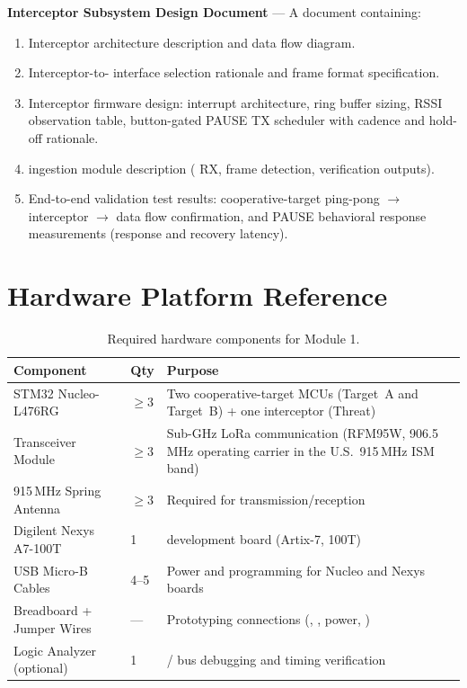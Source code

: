 \documentclass[11pt,letterpaper]{article}
\begin{document}
	\begin{tcolorbox}[deliverable={Session 4 Deliverable}]
		\textbf{Interceptor Subsystem Design Document} --- A document containing:
		\begin{enumerate}
			\item Interceptor architecture description and data flow diagram.
			\item Interceptor-to-\FPGA{} interface selection rationale and frame format specification.
			\item Interceptor firmware design: interrupt architecture, ring buffer sizing, RSSI observation table, button-gated PAUSE TX scheduler with cadence and hold-off rationale.
			\item \FPGA{} ingestion module description (\UART{} RX, frame detection, verification outputs).
			\item End-to-end validation test results: cooperative-target ping-pong $\to$ interceptor $\to$ \FPGA{} data flow confirmation, and PAUSE behavioral response measurements (response and recovery latency).
		\end{enumerate}
	\end{tcolorbox}

	\newpage
	\section{Hardware Platform Reference}
	\label{sec:hardware}

	\begin{table}[ht!]
		\centering
		\caption{Required hardware components for Module 1.}
		\label{tab:hardware}
		\renewcommand{\arraystretch}{1.3}
		\begin{tabularx}{\textwidth}{l l X}
			\toprule
			\textbf{Component} & \textbf{Qty} & \textbf{Purpose} \\
			\midrule
			STM32 Nucleo-L476RG & $\geq 3$ & Two cooperative-target MCUs (Target~A and Target~B) + one interceptor (Threat) \MCU{} \\
			\RF{} Transceiver Module & $\geq 3$ & Sub-GHz LoRa communication (RFM95W, 906.5\,MHz operating carrier in the U.S.\ 915\,MHz ISM band) \\
			915\,MHz Spring Antenna & $\geq 3$ & Required for \RF{} transmission/reception \\
			Digilent Nexys A7-100T & 1 & \FPGA{} development board (Artix-7, 100T) \\
			USB Micro-B Cables & 4--5 & Power and programming for Nucleo and Nexys boards \\
			Breadboard + Jumper Wires & --- & Prototyping connections (\SPI{}, \GPIO{}, power, \UART{}) \\
			Logic Analyzer (optional) & 1 & \SPI{}/\UART{} bus debugging and timing verification \\
			\bottomrule
		\end{tabularx}
	\end{table}
\end{document}
